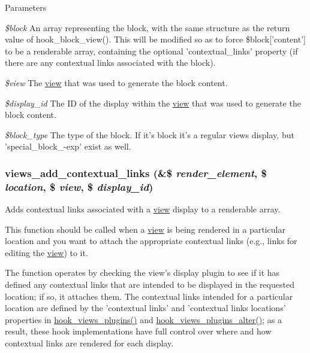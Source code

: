 \begin{DoxyParams}{Parameters}
\item[{\em \$block}]An array representing the block, with the same structure as the return value of hook\_\-block\_\-view(). This will be modified so as to force \$block\mbox{[}'content'\mbox{]} to be a renderable array, containing the optional 'contextual\_\-links' property (if there are any contextual links associated with the block). \item[{\em \$view}]The \hyperlink{classview}{view} that was used to generate the block content. \item[{\em \$display\_\-id}]The ID of the display within the \hyperlink{classview}{view} that was used to generate the block content. \item[{\em \$block\_\-type}]The type of the block. If it's block it's a regular views display, but 'special\_\-block\_\--\/exp' exist as well. \end{DoxyParams}
\hypertarget{views_8module_ada5efae53eaaac7b5d9a1411aae14138}{
\subsubsection[{views\_\-add\_\-contextual\_\-links}]{\setlength{\rightskip}{0pt plus 5cm}views\_\-add\_\-contextual\_\-links (\&\$ {\em render\_\-element}, \/  \$ {\em location}, \/  \$ {\em view}, \/  \$ {\em display\_\-id})}}
\label{views_8module_ada5efae53eaaac7b5d9a1411aae14138}
Adds contextual links associated with a \hyperlink{classview}{view} display to a renderable array.

This function should be called when a \hyperlink{classview}{view} is being rendered in a particular location and you want to attach the appropriate contextual links (e.g., links for editing the \hyperlink{classview}{view}) to it.

The function operates by checking the view's display plugin to see if it has defined any contextual links that are intended to be displayed in the requested location; if so, it attaches them. The contextual links intended for a particular location are defined by the 'contextual links' and 'contextual links locations' properties in \hyperlink{group__views__hooks_ga23f6e9972b2ed84fc54b7ff63f44477d}{hook\_\-views\_\-plugins()} and \hyperlink{group__views__hooks_ga6c4e4c2a769b0017bf0edcd0adae57e9}{hook\_\-views\_\-plugins\_\-alter()}; as a result, these hook implementations have full control over where and how contextual links are rendered for each display.

